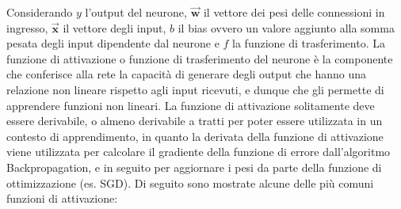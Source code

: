 Considerando $y$ l'output del neurone, $\vec{\mathbf{w}}$ il vettore dei pesi delle connessioni in ingresso, 
$\vec{\mathbf{x}}$ il vettore degli input, $b$ il bias ovvero un valore aggiunto alla somma pesata degli input 
dipendente dal neurone e $f$ la funzione di trasferimento.
La funzione di attivazione o funzione di trasferimento del neurone è la componente che conferisce alla rete la capacità di generare degli output
che hanno una relazione non lineare rispetto agli input ricevuti, e dunque che gli permette di apprendere funzioni non lineari.
La funzione di attivazione solitamente deve essere derivabile, o almeno derivabile a tratti per poter essere utilizzata in un contesto di apprendimento,
in quanto la derivata della funzione di attivazione viene utilizzata per calcolare il gradiente della funzione di errore dall'algoritmo Backpropagation,
e in seguito per aggiornare i pesi da parte della funzione di ottimizzazione (es. SGD).
Di seguito sono mostrate alcune delle più comuni funzioni di attivazione:

